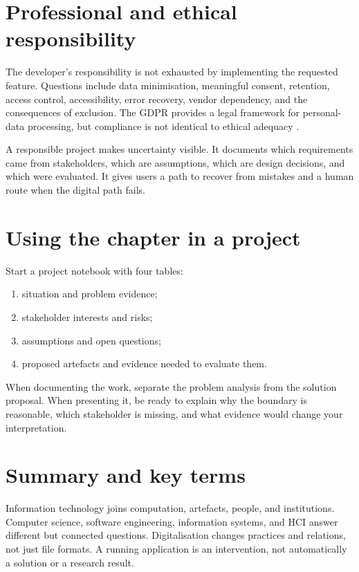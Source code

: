 
\section{Professional and ethical responsibility}
The developer's responsibility is not exhausted by implementing the requested feature. Questions include data minimisation, meaningful consent, retention, access control, accessibility, error recovery, vendor dependency, and the consequences of exclusion. The GDPR provides a legal framework for personal-data processing, but compliance is not identical to ethical adequacy \citep{gdpr2016}.

A responsible project makes uncertainty visible. It documents which requirements came from stakeholders, which are assumptions, which are design decisions, and which were evaluated. It gives users a path to recover from mistakes and a human route when the digital path fails.

\section{Using the chapter in a project}
Start a project notebook with four tables:
\begin{enumerate}
\item situation and problem evidence;
\item stakeholder interests and risks;
\item assumptions and open questions;
\item proposed artefacts and evidence needed to evaluate them.
\end{enumerate}
When documenting the work, separate the problem analysis from the solution proposal. When presenting it, be ready to explain why the boundary is reasonable, which stakeholder is missing, and what evidence would change your interpretation.

\section{Summary and key terms}
Information technology joins computation, artefacts, people, and institutions. Computer science, software engineering, information systems, and HCI answer different but connected questions. Digitalisation changes practices and relations, not just file formats. A running application is an intervention, not automatically a solution or a research result.

